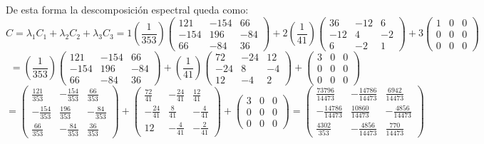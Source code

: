 \begin{itemize}
    De esta forma la descomposición espectral queda como:\
    \[C=\lambda_1C_1+\lambda_2C_2+\lambda_3C_3=1\left(\frac{1}{353}\right)\begin{pmatrix}121&-154&66\\-154&196&-84\\66&-84&36\end{pmatrix}+2\left(\frac{1}{41}\right)\begin{pmatrix}36&-12&6\\-12&4&-2\\6&-2&1\end{pmatrix}+3\begin{pmatrix}1&0&0\\0&0&0\\0&0&0\end{pmatrix}\]\[=\left(\frac{1}{353}\right)\begin{pmatrix}121&-154&66\\-154&196&-84\\66&-84&36\end{pmatrix}+\left(\frac{1}{41}\right)\begin{pmatrix}72&-24&12\\-24&8&-4\\12&-4&2\end{pmatrix}+\begin{pmatrix}3&0&0\\0&0&0\\0&0&0\end{pmatrix}\]
    \[=\begin{pmatrix}\frac{121}{353}&-\frac{154}{353}&\frac{66}{353}\\-\frac{154}{353}&\frac{196}{353}&-\frac{84}{353}\\\frac{66}{353}&-\frac{84}{353}&\frac{36}{353}\end{pmatrix}+\begin{pmatrix}\frac{72}{41}&-\frac{24}{41}&\frac{12}{41}\\-\frac{24}{41}&\frac{8}{41}&-\frac{4}{41}\\12&-\frac{4}{41}&-\frac{2}{41}\end{pmatrix}+\begin{pmatrix}3&0&0\\0&0&0\\0&0&0\end{pmatrix}=\begin{pmatrix}\frac{73796}{14473}&-\frac{14786}{14473}&\frac{6942}{14473}\\ -\frac{14786}{14473}&\frac{10860}{14473}&-\frac{4856}{14473}\\ \frac{4302}{353}&-\frac{4856}{14473}&\frac{770}{14473}\end{pmatrix}\]
    

\end{itemize}
